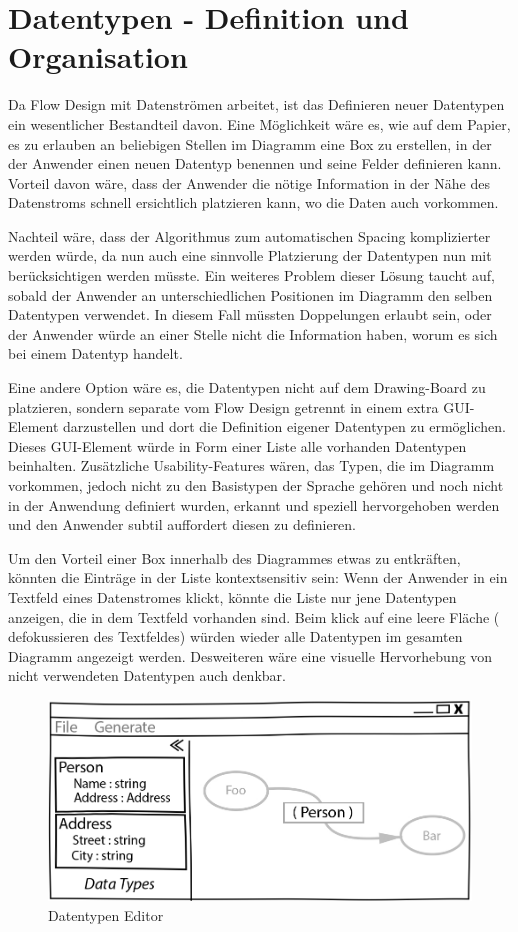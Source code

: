 \section{Datentypen - Definition und Organisation}

Da Flow Design mit Datenströmen arbeitet, ist das Definieren neuer Datentypen
ein wesentlicher Bestandteil davon.
Eine Möglichkeit wäre es, wie auf dem Papier, es zu erlauben an beliebigen
Stellen im Diagramm eine Box zu erstellen, in der der Anwender einen neuen
Datentyp benennen und seine Felder definieren kann. Vorteil davon wäre, dass der
Anwender die nötige Information in der Nähe des Datenstroms schnell ersichtlich
platzieren kann, wo die Daten auch vorkommen.

Nachteil wäre, dass der Algorithmus zum automatischen Spacing komplizierter
werden würde, da nun auch eine sinnvolle Platzierung der Datentypen nun mit
berücksichtigen werden müsste.
Ein weiteres Problem dieser Lösung taucht auf, sobald der Anwender an unterschiedlichen
Positionen im Diagramm den selben Datentypen verwendet. In diesem Fall müssten Doppelungen erlaubt
sein, oder der Anwender würde an einer Stelle nicht die Information haben, worum
es sich bei einem Datentyp handelt.

Eine andere Option wäre es, die Datentypen nicht auf dem Drawing-Board zu
platzieren, sondern separate vom Flow Design getrennt in einem extra GUI-Element
darzustellen und dort die Definition eigener Datentypen zu ermöglichen.
Dieses GUI-Element würde in Form einer Liste alle vorhanden Datentypen
beinhalten. Zusätzliche Usability-Features wären, das Typen, die im Diagramm
vorkommen, jedoch nicht zu den Basistypen der Sprache gehören und noch nicht in
der Anwendung definiert wurden, erkannt und speziell hervorgehoben werden und
den Anwender subtil auffordert diesen zu definieren.

Um den Vorteil einer Box innerhalb des Diagrammes etwas zu entkräften, könnten
die Einträge in der Liste kontextsensitiv sein: Wenn der Anwender in ein
Textfeld eines Datenstromes klickt, könnte die Liste nur jene Datentypen
anzeigen, die in dem Textfeld vorhanden sind. Beim klick auf eine leere Fläche (
defokussieren des Textfeldes) würden wieder alle Datentypen im gesamten Diagramm
angezeigt werden. Desweiteren wäre eine visuelle Hervorhebung von nicht
verwendeten Datentypen auch denkbar.
\bigskip

\begin{figure}[H]
	\centering
	\includegraphics[width=.9\linewidth]{./img/DatatypesCrop.jpg}
	\caption{Datentypen Editor}
\end{figure}





